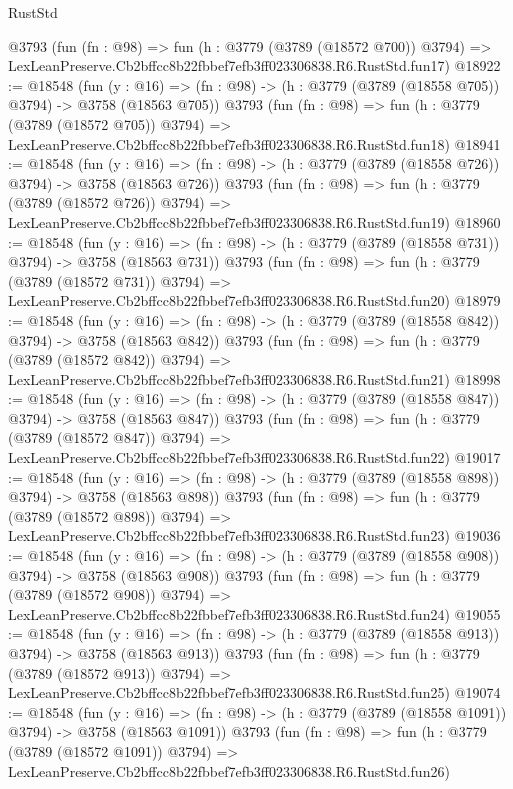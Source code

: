\begin{lexlean}{RustStd}
\begin{coremodule}
    @3793
    (fun (fn : @98) =>
    fun (h : @3779 (@3789 (@18572 @700)) @3794) =>
    LexLeanPreserve.Cb2bffcc8b22fbbef7efb3ff023306838.R6.RustStd.fun17)
@18922 := @18548
    (fun (y : @16) => (fn : @98) -> (h : @3779 (@3789 (@18558 @705)) @3794) -> @3758 (@18563 @705))
    @3793
    (fun (fn : @98) =>
    fun (h : @3779 (@3789 (@18572 @705)) @3794) =>
    LexLeanPreserve.Cb2bffcc8b22fbbef7efb3ff023306838.R6.RustStd.fun18)
@18941 := @18548
    (fun (y : @16) => (fn : @98) -> (h : @3779 (@3789 (@18558 @726)) @3794) -> @3758 (@18563 @726))
    @3793
    (fun (fn : @98) =>
    fun (h : @3779 (@3789 (@18572 @726)) @3794) =>
    LexLeanPreserve.Cb2bffcc8b22fbbef7efb3ff023306838.R6.RustStd.fun19)
@18960 := @18548
    (fun (y : @16) => (fn : @98) -> (h : @3779 (@3789 (@18558 @731)) @3794) -> @3758 (@18563 @731))
    @3793
    (fun (fn : @98) =>
    fun (h : @3779 (@3789 (@18572 @731)) @3794) =>
    LexLeanPreserve.Cb2bffcc8b22fbbef7efb3ff023306838.R6.RustStd.fun20)
@18979 := @18548
    (fun (y : @16) => (fn : @98) -> (h : @3779 (@3789 (@18558 @842)) @3794) -> @3758 (@18563 @842))
    @3793
    (fun (fn : @98) =>
    fun (h : @3779 (@3789 (@18572 @842)) @3794) =>
    LexLeanPreserve.Cb2bffcc8b22fbbef7efb3ff023306838.R6.RustStd.fun21)
@18998 := @18548
    (fun (y : @16) => (fn : @98) -> (h : @3779 (@3789 (@18558 @847)) @3794) -> @3758 (@18563 @847))
    @3793
    (fun (fn : @98) =>
    fun (h : @3779 (@3789 (@18572 @847)) @3794) =>
    LexLeanPreserve.Cb2bffcc8b22fbbef7efb3ff023306838.R6.RustStd.fun22)
@19017 := @18548
    (fun (y : @16) => (fn : @98) -> (h : @3779 (@3789 (@18558 @898)) @3794) -> @3758 (@18563 @898))
    @3793
    (fun (fn : @98) =>
    fun (h : @3779 (@3789 (@18572 @898)) @3794) =>
    LexLeanPreserve.Cb2bffcc8b22fbbef7efb3ff023306838.R6.RustStd.fun23)
@19036 := @18548
    (fun (y : @16) => (fn : @98) -> (h : @3779 (@3789 (@18558 @908)) @3794) -> @3758 (@18563 @908))
    @3793
    (fun (fn : @98) =>
    fun (h : @3779 (@3789 (@18572 @908)) @3794) =>
    LexLeanPreserve.Cb2bffcc8b22fbbef7efb3ff023306838.R6.RustStd.fun24)
@19055 := @18548
    (fun (y : @16) => (fn : @98) -> (h : @3779 (@3789 (@18558 @913)) @3794) -> @3758 (@18563 @913))
    @3793
    (fun (fn : @98) =>
    fun (h : @3779 (@3789 (@18572 @913)) @3794) =>
    LexLeanPreserve.Cb2bffcc8b22fbbef7efb3ff023306838.R6.RustStd.fun25)
@19074 := @18548
    (fun (y : @16) =>
    (fn : @98) -> (h : @3779 (@3789 (@18558 @1091)) @3794) -> @3758 (@18563 @1091))
    @3793
    (fun (fn : @98) =>
    fun (h : @3779 (@3789 (@18572 @1091)) @3794) =>
    LexLeanPreserve.Cb2bffcc8b22fbbef7efb3ff023306838.R6.RustStd.fun26)

\end{coremodule}
\end{lexlean}
